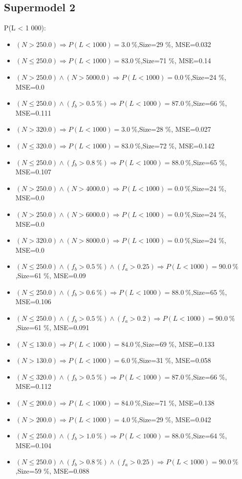 \documentclass[numbered]{CSL}
\begin{document}
\subsection{Supermodel 2}
P(L < 1 000):
\begin{itemize}
\item $(N > 250.0) \Rightarrow P(L < 1 000) = 3.0~\%$,\hfill Size=29 \%, MSE=0.032
\item $(N \leq 250.0) \Rightarrow P(L < 1 000) = 83.0~\%$,\hfill Size=71 \%, MSE=0.14
\item $(N > 250.0) \land (N > 5000.0) \Rightarrow P(L < 1 000) = 0.0~\%$,\hfill Size=24 \%, MSE=0.0
\item $(N \leq 250.0) \land (f_b > 0.5~\%) \Rightarrow P(L < 1 000) = 87.0~\%$,\hfill Size=66 \%, MSE=0.111
\item $(N > 320.0) \Rightarrow P(L < 1 000) = 3.0~\%$,\hfill Size=28 \%, MSE=0.027
\item $(N \leq 320.0) \Rightarrow P(L < 1 000) = 83.0~\%$,\hfill Size=72 \%, MSE=0.142
\item $(N \leq 250.0) \land (f_b > 0.8~\%) \Rightarrow P(L < 1 000) = 88.0~\%$,\hfill Size=65 \%, MSE=0.107
\item $(N > 250.0) \land (N > 4000.0) \Rightarrow P(L < 1 000) = 0.0~\%$,\hfill Size=24 \%, MSE=0.0
\item $(N > 250.0) \land (N > 6000.0) \Rightarrow P(L < 1 000) = 0.0~\%$,\hfill Size=24 \%, MSE=0.0
\item $(N > 320.0) \land (N > 8000.0) \Rightarrow P(L < 1 000) = 0.0~\%$,\hfill Size=24 \%, MSE=0.0
\item $(N \leq 250.0) \land (f_b > 0.5~\%) \land (f_a > 0.25) \Rightarrow P(L < 1 000) = 90.0~\%$,\hfill Size=61 \%, MSE=0.09
\item $(N \leq 250.0) \land (f_b > 0.6~\%) \Rightarrow P(L < 1 000) = 88.0~\%$,\hfill Size=65 \%, MSE=0.106
\item $(N \leq 250.0) \land (f_b > 0.5~\%) \land (f_a > 0.2) \Rightarrow P(L < 1 000) = 90.0~\%$,\hfill Size=61 \%, MSE=0.091
\item $(N \leq 130.0) \Rightarrow P(L < 1 000) = 84.0~\%$,\hfill Size=69 \%, MSE=0.133
\item $(N > 130.0) \Rightarrow P(L < 1 000) = 6.0~\%$,\hfill Size=31 \%, MSE=0.058
\item $(N \leq 320.0) \land (f_b > 0.5~\%) \Rightarrow P(L < 1 000) = 87.0~\%$,\hfill Size=66 \%, MSE=0.112
\item $(N \leq 200.0) \Rightarrow P(L < 1 000) = 84.0~\%$,\hfill Size=71 \%, MSE=0.138
\item $(N > 200.0) \Rightarrow P(L < 1 000) = 4.0~\%$,\hfill Size=29 \%, MSE=0.042
\item $(N \leq 250.0) \land (f_b > 1.0~\%) \Rightarrow P(L < 1 000) = 88.0~\%$,\hfill Size=64 \%, MSE=0.104
\item $(N \leq 250.0) \land (f_b > 0.8~\%) \land (f_a > 0.25) \Rightarrow P(L < 1 000) = 90.0~\%$,\hfill Size=59 \%, MSE=0.088
\end{itemize}
\end{document}
